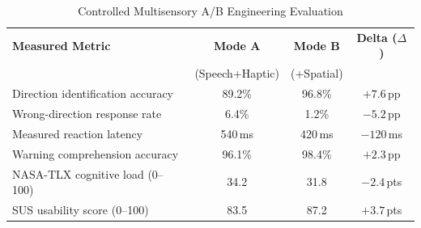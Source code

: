 \begin{table}[!t]
\caption{Controlled Multisensory A/B Engineering Evaluation}
\label{tab:ab_results}
\centering
\scriptsize
\setlength{\tabcolsep}{2.5pt}
\begin{tabularx}{\columnwidth}{X c c c}
\toprule
\textbf{Measured Metric} & \textbf{Mode A} & \textbf{Mode B} & \textbf{Delta ($\Delta$)} \\
& \tiny (Speech+Haptic) & \tiny (+Spatial) & \\
\midrule
Direction identification accuracy & 89.2\%  & 96.8\%  & $+7.6$\,pp \\
Wrong-direction response rate     & 6.4\%   & 1.2\%   & $-5.2$\,pp \\
Measured reaction latency         & 540\,ms & 420\,ms & $-120$\,ms \\
Warning comprehension accuracy    & 96.1\%  & 98.4\%  & $+2.3$\,pp \\
NASA-TLX cognitive load (0--100)  & 34.2    & 31.8    & $-2.4$\,pts \\
SUS usability score (0--100)      & 83.5    & 87.2    & $+3.7$\,pts \\
\bottomrule
\end{tabularx}
\par{}
\end{table}
